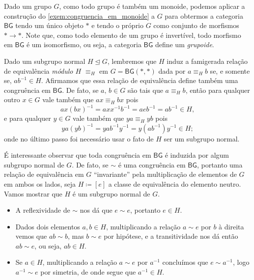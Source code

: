 \begin{exem}\label{exem:congruencias_em_grupos}
    Dado um grupo $G$, como todo grupo é também um monoide, podemos aplicar a construção do \cref{exem:congruencia_em_monoide} a $G$ para obtermos a categoria $\mathsf{BG}$ tendo um único objeto $*$ e tendo o próprio $G$ como conjunto de morfismos $* \to *$.
    Note que, como todo elemento de um grupo é invertível, todo morfismo em $\mathsf{BG}$ é um isomorfismo, ou seja, a categoria $\mathsf{BG}$ define um \emph{grupoide}.

    Dado um subgrupo normal $H \trianglelefteq G$, lembremos que $H$ induz a famigerada relação de equivalência \emph{módulo $H$} $\equiv_H$ em $G = \mathsf{BG}(*,*)$ dada por $a \equiv_H b$ se, e somente se, $ab^{-1} \in H$.
    Afirmamos que essa relação de equivalência define também uma congruência em $\mathsf{BG}$.
    De fato, se $a,\,b \in G$ são tais que $a \equiv_H b$, então para qualquer outro $x \in G$ vale também que $ax \equiv_H bx$ pois
    \begin{displaymath}
        ax(bx)^{-1} = axx^{-1}b^{-1} = aeb^{-1} = ab^{-1} \in H,
    \end{displaymath}
    e para qualquer $y \in G$ vale também que $ya \equiv_H yb$ pois
    \begin{displaymath}
        ya(yb)^{-1} = yab^{-1}y^{-1} = y(ab^{-1})y^{-1} \in H;
    \end{displaymath}
    onde no último passo foi necessário usar o fato de $H$ ser um subgrupo normal.

    É interessante observar que toda congruência em $\mathsf{BG}$ é induzida por algum subgrupo normal de $G$.
    De fato, se $\sim$ é uma congruência em $\mathsf{BG}$, portanto uma relação de equivalência em $G$ ``invariante'' pela multiplicação de elementos de $G$ em ambos os lados, seja $H \coloneqq [e]$ a classe de equivalência do elemento neutro.
    Vamos mostrar que $H$ é um subgrupo normal de $G$.
    \begin{itemize}
        \item A reflexividade de $\sim$ nos dá que $e \sim e$, portanto $e \in H$.

        \item Dados dois elementos $a,b \in H$, multiplicando a relação $a \sim e$ por $b$ à direita vemos que $ab \sim b$, mas $b \sim e$ por hipótese, e a transitividade nos dá então $ab \sim e$, ou seja, $ab \in H$.
        
        \item Se $a \in H$, multiplicando a relação $a \sim e$ por $a^{-1}$ concluímos que $e \sim a^{-1}$, logo $a^{-1} \sim e$ por simetria, de onde segue que $a^{-1} \in H$.
    

\end{itemize}
\end{exem}
